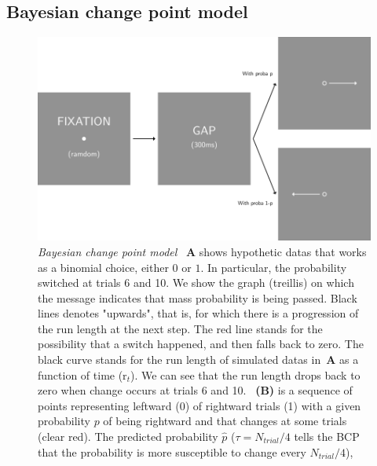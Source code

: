 \documentclass[profile,final,english,draft]{article}%
\newcommand{\seeFig}[1]{Figure~\ref{fig:#1}}
\begin{document}
\subsection{Bayesian change point model}
\begin{figure}%
\begin{center}
\includegraphics[width=\linewidth]{figure3}
\end{center}
\caption{\emph{Bayesian change point model}
~\textbf{A} shows hypothetic datas that works as a binomial choice, either $0$ or $1$. 
In particular, the probability switched at trials 6 and 10. 
We show the graph (treillis) on which the message indicates that 
mass probability is being passed. 
Black lines denotes "upwards", 
that is, for which there is a progression of the run length at the next step. 
The red line stands for the possibility that a switch happened, 
and then falls back to zero. 
The black curve stands for 
the run length of simulated datas in~\textbf{A} 
as a function of time (r$_t$). 
We can see that 
the run length drops back to zero 
when change occurs at trials 6 and 10.
~\textbf{(B)} is a sequence of points representing 
leftward (0) of rightward trials (1) 
with a given probability $p$ of being rightward and 
that changes at some trials (clear red). 
The predicted probability $\hat{p}$ ($\tau=N_{trial}/4$ tells the BCP 
that the probability is more susceptible to change every $N_{trial}/4$), 
}
\end{figure}
\end{document}
